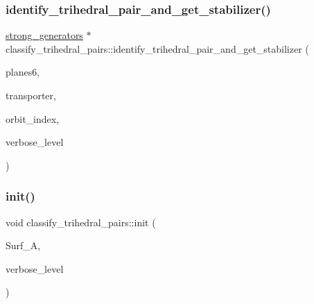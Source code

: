 \mbox{\label{classclassify__trihedral__pairs_a433489bad83d619b71a688e6a03a3210}} 
\subsubsection{\texorpdfstring{identify\+\_\+trihedral\+\_\+pair\+\_\+and\+\_\+get\+\_\+stabilizer()}{identify\_trihedral\_pair\_and\_get\_stabilizer()}}
{\footnotesize\ttfamily \mbox{\hyperlink{classstrong__generators}{strong\+\_\+generators}} $\ast$ classify\+\_\+trihedral\+\_\+pairs\+::identify\+\_\+trihedral\+\_\+pair\+\_\+and\+\_\+get\+\_\+stabilizer (\begin{DoxyParamCaption}\item[{\mbox{\hyperlink{galois_8h_a09fddde158a3a20bd2dcadb609de11dc}{I\+NT}} $\ast$}]{planes6,  }\item[{\mbox{\hyperlink{galois_8h_a09fddde158a3a20bd2dcadb609de11dc}{I\+NT}} $\ast$}]{transporter,  }\item[{\mbox{\hyperlink{galois_8h_a09fddde158a3a20bd2dcadb609de11dc}{I\+NT}} \&}]{orbit\+\_\+index,  }\item[{\mbox{\hyperlink{galois_8h_a09fddde158a3a20bd2dcadb609de11dc}{I\+NT}}}]{verbose\+\_\+level }\end{DoxyParamCaption})}

\mbox{\label{classclassify__trihedral__pairs_aa71b831292894efc9687cb3e8c8dd73e}} 
\subsubsection{\texorpdfstring{init()}{init()}}
{\footnotesize\ttfamily void classify\+\_\+trihedral\+\_\+pairs\+::init (\begin{DoxyParamCaption}\item[{\mbox{\hyperlink{classsurface__with__action}{surface\+\_\+with\+\_\+action}} $\ast$}]{Surf\+\_\+A,  }\item[{\mbox{\hyperlink{galois_8h_a09fddde158a3a20bd2dcadb609de11dc}{I\+NT}}}]{verbose\+\_\+level }\end{DoxyParamCaption})}

